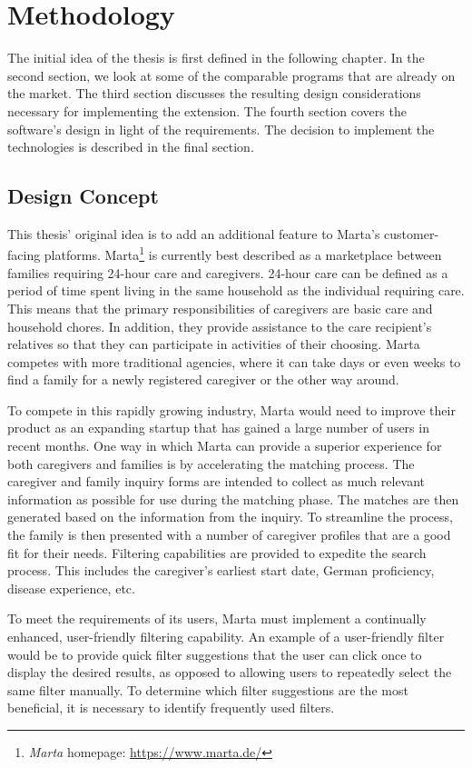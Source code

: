 \newpage
\chapter{Methodology}
The initial idea of the thesis is first defined in the following chapter. In the second section, we look at some of the comparable programs that are already on the market. The third section discusses the resulting design considerations necessary for implementing the extension. The fourth section covers the software's design in light of the requirements. The decision to implement the technologies is described in the final section.

\section{Design Concept}
This thesis' original idea is to add an additional feature to Marta's customer-facing platforms. Marta\footnote{\emph{Marta} homepage: \url{https://www.marta.de/}} is currently best described as a marketplace between families requiring 24-hour care and caregivers. 24-hour care can be defined as a period of time spent living in the same household as the individual requiring care. This means that the primary responsibilities of caregivers are basic care and household chores. In addition, they provide assistance to the care recipient's relatives so that they can participate in activities of their choosing. Marta competes with more traditional agencies, where it can take days or even weeks to find a family for a newly registered caregiver or the other way around.

To compete in this rapidly growing industry, Marta would need to improve their product as an expanding startup that has gained a large number of users in recent months. One way in which Marta can provide a superior experience for both caregivers and families is by accelerating the matching process. The caregiver and family inquiry forms are intended to collect as much relevant information as possible for use during the matching phase. The matches are then generated based on the information from the inquiry. To streamline the process, the family is then presented with a number of caregiver profiles that are a good fit for their needs. Filtering capabilities are provided to expedite the search process. This includes the caregiver's earliest start date, German proficiency, disease experience, etc.

To meet the requirements of its users, Marta must implement a continually enhanced, user-friendly filtering capability. An example of a user-friendly filter would be to provide quick filter suggestions that the user can click once to display the desired results, as opposed to allowing users to repeatedly select the same filter manually. To determine which filter suggestions are the most beneficial, it is necessary to identify frequently used filters.

